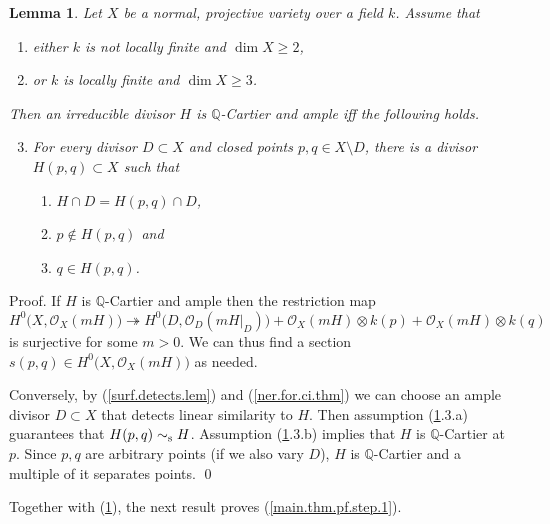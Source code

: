 \documentclass{amsart}
\newtheorem{lem}[thm]{Lemma}
\theoremstyle{definition}
\theoremstyle{remark}
\renewcommand{\o}[0]{{\mathcal O}}
\newcommand{\q}[0]{{\mathbb Q}}
\newcommand{\onto}[0]{\twoheadrightarrow}
\newcommand{\sims}[0]{\sim_{\rm s}}
\begin{document}
\begin{lem}\label{ample.is.top.lem}
 Let $X$ be a normal, projective variety over a field $k$.
Assume that  
\begin{enumerate}
\item either $k$ is not locally finite and $\dim X\geq 2$,
\item or $k$ is  locally finite and $\dim X\geq 3$.
\end{enumerate}
Then an irreducible divisor  $H$ is $\q$-Cartier and ample iff the following holds.
\begin{enumerate}\setcounter{enumi}{2}
\item For every divisor $D\subset X$ 
and closed points $p,q\in X\setminus D$, there is a divisor  $H(p,q)\subset X$ such that
\begin{enumerate}
\item  $H\cap D=H(p,q)\cap D$,
\item $p\notin H(p,q)$ and 
\item $q\in H(p,q)$.
\end{enumerate}
\end{enumerate}
\end{lem}

Proof.  If $H$ is $\q$-Cartier and ample then the restriction map
$$
H^0\bigl(X, \o_X(mH)\bigr)\onto H^0\bigl(D, \o_D(mH|_D)\bigr)+\o_X(mH)\otimes k(p)+\o_X(mH)\otimes k(q)
$$
is surjective for some $m>0$. We can thus find a section $s(p,q)\in H^0\bigl(X, \o_X(mH)\bigr)$ as needed.

Conversely, by (\ref{surf.detects.lem}) and (\ref{ner.for.ci.thm})  we can choose an ample divisor $D\subset X$ that detects  linear similarity to $H$.
Then assumption (\ref{ample.is.top.lem}.3.a) guarantees that $H(p,q)\sims H$. 
Assumption (\ref{ample.is.top.lem}.3.b) implies that $H$ is $\q$-Cartier at $p$.
Since $p,q$ are  arbitrary points (if we also vary $D$),   $H$ is $\q$-Cartier   and a multiple of it  separates points. \qed

\medskip




Together with (\ref{ample.is.top.lem}), the next result proves  (\ref{main.thm.pf.step.1}).
\end{document}
